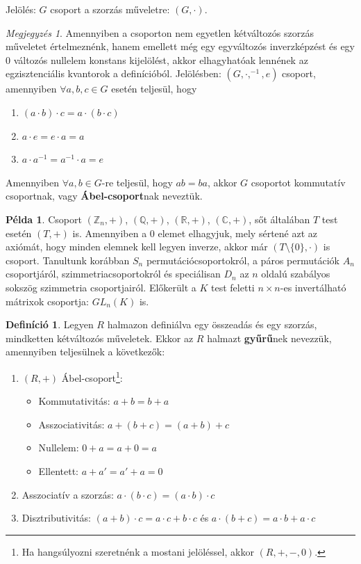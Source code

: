 \documentclass[12pt]{book}
\theoremstyle{plain} %
\theoremstyle{definition} %
\newtheorem{defi/}{Definíció}[section]
\newenvironment{defi}
  {\renewcommand{\qedsymbol}{$\clubsuit$}%
   \pushQED{\qed}\begin{defi/}}
  {\popQED\end{defi/}}
\newtheorem{pl}{Példa}[section]
\theoremstyle{remark}
\newtheorem*{mj}{Megjegyzés}
\renewcommand\qedsymbol{$\blacksquare$}
\numberwithin{equation}{section}  %
\def\Q{\mathbb{Q}}
\def\R{\mathbb{R}}
\def\Z{\mathbb{Z}}
\def\C{\mathbb{C}}
\begin{document}
	Jelölés: $G$ csoport a szorzás műveletre: $(G,\cdot)$.
	
	\begin{mj}
		Amennyiben a csoporton nem egyetlen kétváltozós szorzás műveletet értelmeznénk, hanem emellett még egy egyváltozós inverzképzést és egy $0$ változós nullelem konstans kijelölést, akkor elhagyhatóak lennének az egzisztenciális kvantorok a definícióból. Jelölésben: $(G,\cdot,^{-1},e)$ csoport, amennyiben $\forall a,b,c\in G$ esetén teljesül, hogy
		\begin{enumerate}
			\item $(a\cdot b)\cdot c = a \cdot (b\cdot c)$
			\item $a\cdot e = e \cdot a = a$
			\item $a\cdot a^{-1} = a^{-1} \cdot a = e$
		\end{enumerate}
	\end{mj}

	Amennyiben $\forall a, b\in G$-re teljesül, hogy $ab=ba$, akkor $G$ csoportot kommutatív csoportnak, vagy \textbf{Ábel-csoport}nak neveztük.
	
	\begin{pl}
		Csoport $(\Z_n,+)$, $(\Q,+)$, $(\R,+)$, $(\C,+)$, sőt általában $T$ test esetén $(T,+)$ is. Amennyiben a $0$ elemet elhagyjuk, mely sértené azt az axiómát, hogy minden elemnek kell legyen inverze, akkor már $(T\setminus \{0\}, \cdot )$ is csoport. Tanultunk korábban $S_n$ permutációcsoportokról, a páros permutációk $A_n$ csoportjáról, szimmetriacsoportokról és speciálisan $D_n$ az $n$ oldalú szabályos sokszög szimmetria csoportjairól. Előkerült a $K$ test feletti $n\times n$-es invertálható mátrixok csoportja: $GL_n(K)$ is.
	\end{pl}

	\begin{defi}
		Legyen $R$ halmazon definiálva egy összeadás és egy szorzás, mindketten kétváltozós műveletek. Ekkor az $R$ halmazt \textbf{gyűrű}nek nevezzük, amennyiben teljesülnek a következők:
		\begin{enumerate}
			\item{$(R,+)$ Ábel-csoport\footnote{Ha hangsúlyozni szeretnénk a mostani jelöléssel, akkor $(R,+,-,0)$.}:
			\begin{itemize}
				\item Kommutativitás: $a+b=b+a$
				\item Asszociativitás: $a+(b+c)=(a+b)+c$
				\item Nullelem: $0+a=a+0=a$
				\item Ellentett: $a+a' = a'+a = 0$
			\end{itemize}	
		}
			\item{Asszociatív a szorzás: $a\cdot (b\cdot c) = (a\cdot b)\cdot c$}
			\item{Disztributivitás: $(a+b)\cdot c = a\cdot c + b\cdot c$ és $a\cdot(b+c)=a\cdot b + a \cdot c$}
		\end{enumerate}
	\end{defi}
\end{document}
